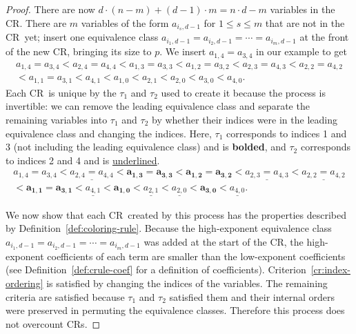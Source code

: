 \documentclass[10pt,a4paper]{article}
\newcommand{\crulenospace}{CR}
\newcommand{\crule}{\crulenospace~}
\newcommand{\crulesnospace}{\crulenospace s}
\newcommand{\numpoints}{n}
\newcommand{\inumpoints}{i}
\newcommand{\commonconst}{a}
\theoremstyle{plain}
\theoremstyle{definition}
\begin{document}
\begin{proof}
There are now $d \cdot (\numpoints - m) + (d - 1) \cdot m = \numpoints \cdot d - m$ variables in the \crulenospace. There are $m$ variables of the form $\commonconst_{\inumpoints_s,d-1}$ for $1 \leq s \leq m$ that are not in the \crule yet; insert one equivalence class $\commonconst_{\inumpoints_1,d-1} = \commonconst_{\inumpoints_2,d-1} = \cdots = \commonconst_{\inumpoints_m,d-1}$ at the front of the new \crulenospace, bringing its size to $p$. We insert $\commonconst_{1,4}=\commonconst_{3,4}$ in our example to get \begin{align*}
\commonconst_{1,4}=\commonconst_{3,4} < \commonconst_{2,4} = \commonconst_{4,4} < \commonconst_{1,3} = \commonconst_{3,3} < \commonconst_{1,2} = \commonconst_{3,2} < \commonconst_{2,3} = \commonconst_{4,3} < \commonconst_{2,2} = \commonconst_{4,2} \\ < \commonconst_{1,1} = \commonconst_{3,1} < \commonconst_{4,1} < \commonconst_{1,0} < \commonconst_{2,1} < \commonconst_{2,0} < \commonconst_{3,0} < \commonconst_{4,0}.
\end{align*} 
Each \crule is unique by the $\tau_1$ and $\tau_2$ used to create it because the process is invertible: we can remove the leading equivalence class and separate the remaining variables into $\tau_1$ and $\tau_2$ by whether their indices were in the leading equivalence class and changing the indices. Here, $\tau_1$ corresponds to indices 1 and 3 (not including the leading equivalence class) and is \textbf{bolded}, and $\tau_2$ corresponds to indices 2 and 4 and is \underline{underlined}.
\begin{align*}
\commonconst_{1,4}=\commonconst_{3,4} < \underline{\commonconst_{2,4} = \commonconst_{4,4}} < \mathbf{\commonconst_{1,3} = \commonconst_{3,3}} < \mathbf{\commonconst_{1,2} = \commonconst_{3,2}} < \underline{\commonconst_{2,3} = \commonconst_{4,3}} < \underline{\commonconst_{2,2} = \commonconst_{4,2}} \\ < \mathbf{\commonconst_{1,1} = \commonconst_{3,1}} < \underline{\commonconst_{4,1}} < \mathbf{\commonconst_{1,0}} < \underline{\commonconst_{2,1}} < \underline{\commonconst_{2,0}} < \mathbf{\commonconst_{3,0}} < \underline{\commonconst_{4,0}}.
\end{align*}

We now show that each \crule created by this process has the properties described by Definition~\ref{def:coloring-rule}. Because the high-exponent equivalence class $\commonconst_{\inumpoints_1,d-1} = \commonconst_{\inumpoints_2,d-1} = \cdots = \commonconst_{\inumpoints_m,d-1}$ was added at the start of the \crulenospace, the high-exponent coefficients of each term are smaller than the low-exponent coefficients (see
Definition~\ref{def:crule-coef} for a definition of coefficients). 
Criterion~\ref{cr:index-ordering} is satisfied by changing the indices of the variables.
The remaining criteria are satisfied because $\tau_1$ and $\tau_2$ satisfied them and their internal orders were preserved in permuting the equivalence classes. Therefore this process does not overcount \crulesnospace.


\end{proof}
\end{document}
